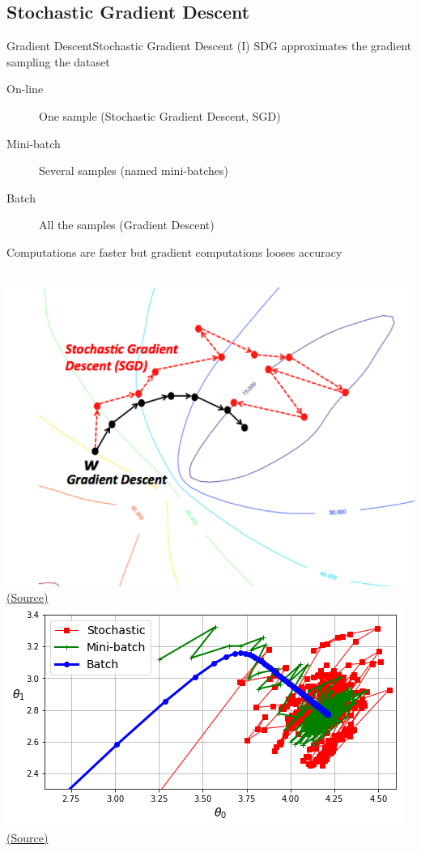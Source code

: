 \documentclass[10pt,compress]{beamer} %
\begin{document}
\subsection{Stochastic Gradient Descent}
\begin{frame}{Gradient Descent}{Stochastic Gradient Descent (I)}
	SDG approximates the gradient sampling the dataset
	\begin{description}
		\item[On-line] One sample (Stochastic Gradient Descent, SGD)
		\item[Mini-batch] Several samples (named mini-batches)
		\item[Batch] All the samples (Gradient Descent)
	\end{description}

   	Computations are faster but gradient computations looses accuracy

	\centering

    \begin{columns}
	\centering \includegraphics[width=0.9\linewidth]{figs/sdg.png}\\
	\scriptsize \href{https://wikidocs.net/3413}{(Source)}
	\centering \includegraphics[width=0.9\linewidth]{figs/sgd-comparison.png}\\
	    \scriptsize \href{https://github.com/tuitet/Hands-On-Machine-Learning-with-Scikit-Learn-Keras-and-TensorFlow-3rd-Edition/blob/main/04_training_linear_models.ipynb}{(Source)}
    \end{columns}
\end{frame}
\end{document}
